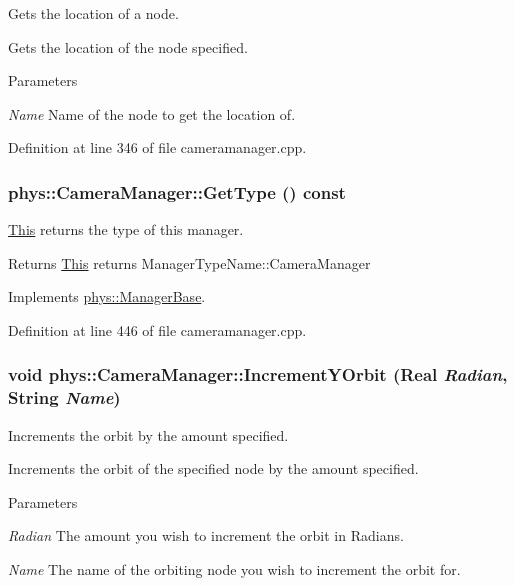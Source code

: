 Gets the location of a node. 

Gets the location of the node specified. 
\begin{DoxyParams}{Parameters}
\item[{\em Name}]Name of the node to get the location of. \end{DoxyParams}


Definition at line 346 of file cameramanager.cpp.

\hypertarget{classphys_1_1CameraManager_a8412ea634307aa280b615a3cc7c9b739}{
\subsubsection[{GetType}]{ phys::CameraManager::GetType () const}}
\label{d9/d91/classphys_1_1CameraManager_a8412ea634307aa280b615a3cc7c9b739}


\hyperlink{structThis}{This} returns the type of this manager. 

\begin{DoxyReturn}{Returns}
\hyperlink{structThis}{This} returns ManagerTypeName::CameraManager 
\end{DoxyReturn}


Implements \hyperlink{classphys_1_1ManagerBase_aff400b6599db635e24796d8221e9a0e3}{phys::ManagerBase}.



Definition at line 446 of file cameramanager.cpp.

\hypertarget{classphys_1_1CameraManager_a82001f0874a090717ced3fbe78ce795b}{
\subsubsection[{IncrementYOrbit}]{\setlength{\rightskip}{0pt plus 5cm}void phys::CameraManager::IncrementYOrbit ({\bf Real} {\em Radian}, \/  {\bf String} {\em Name})}}
\label{d9/d91/classphys_1_1CameraManager_a82001f0874a090717ced3fbe78ce795b}


Increments the orbit by the amount specified. 

Increments the orbit of the specified node by the amount specified. 
\begin{DoxyParams}{Parameters}
\item[{\em Radian}]The amount you wish to increment the orbit in Radians. \item[{\em Name}]The name of the orbiting node you wish to increment the orbit for. \end{DoxyParams}


